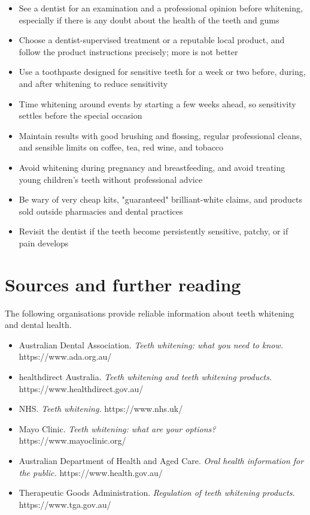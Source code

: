 \begin{itemize}
    \item See a dentist for an examination and a professional opinion before whitening, especially if there is any doubt about the health of the teeth and gums
    \item Choose a dentist-supervised treatment or a reputable local product, and follow the product instructions precisely; more is not better
    \item Use a toothpaste designed for sensitive teeth for a week or two before, during, and after whitening to reduce sensitivity
    \item Time whitening around events by starting a few weeks ahead, so sensitivity settles before the special occasion
    \item Maintain results with good brushing and flossing, regular professional cleans, and sensible limits on coffee, tea, red wine, and tobacco
    \item Avoid whitening during pregnancy and breastfeeding, and avoid treating young children's teeth without professional advice
    \item Be wary of very cheap kits, "guaranteed" brilliant-white claims, and products sold outside pharmacies and dental practices
    \item Revisit the dentist if the teeth become persistently sensitive, patchy, or if pain develops
\end{itemize}

\section*{Sources and further reading}
The following organisations provide reliable information about teeth whitening and dental health.

\begin{itemize}
    \item Australian Dental Association. \textit{Teeth whitening: what you need to know.} https://www.ada.org.au/
    \item healthdirect Australia. \textit{Teeth whitening and teeth whitening products.} https://www.healthdirect.gov.au/
    \item NHS. \textit{Teeth whitening.} https://www.nhs.uk/
    \item Mayo Clinic. \textit{Teeth whitening: what are your options?} https://www.mayoclinic.org/
    \item Australian Department of Health and Aged Care. \textit{Oral health information for the public.} https://www.health.gov.au/
    \item Therapeutic Goods Administration. \textit{Regulation of teeth whitening products.} https://www.tga.gov.au/
\end{itemize}

\clearpage
